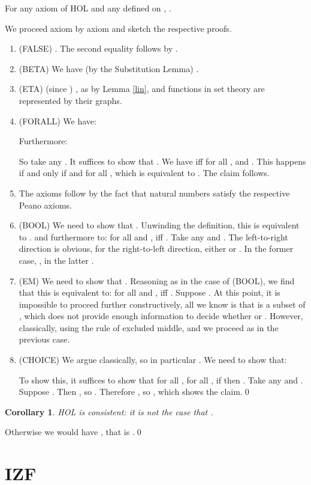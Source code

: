\documentclass{LMCS}
\newtheorem{corollary}[thm]{Corollary}
\begin{document}
\begin{thm}\label{soundness}
For any axiom  of HOL and any  defined on ,  .
\end{thm}
\proof
We proceed axiom by axiom and sketch the respective proofs.
\begin{enumerate}[]
\item (FALSE) . The second equality follows by . 
\item (BETA) 
We have  (by the Substitution Lemma) .
\item (ETA) 
 (since
) , as by Lemma \ref{lin},  and functions in
set theory are represented by their graphs.
\item (FORALL) We have:

Furthermore:

So take any . It suffices to show that .
We have  iff for all ,  and . This happens if and only if  and for all ,  which is equivalent to . The claim follows. 
\item The axioms  follow by the fact that natural numbers
satisfy the respective Peano axioms.
\item (BOOL) We need to show that . Unwinding the definition, this is equivalent to
. and furthermore to: for all  and ,  iff . Take any  and . The
left-to-right direction is obvious, for the right-to-left direction, either  or
. In the former case, , in the latter .
\item (EM) We need to show that . Reasoning as in the case of (BOOL), we find that this is
equivalent to: for all  and ,  iff . Suppose . At this point, it is
impossible to proceed further constructively, all we know is that  is a
subset of , which does not provide enough information to decide whether  or . However, classically, using the rule of excluded middle,  and we
proceed as in the previous case.
\item (CHOICE) 
We argue classically, so in particular . We need to show that:


To show this, it
suffices to show that for all , for all , if  then . Take any
 and . Suppose . Then , so .
Therefore , so 
, which shows the claim.\qed
\end{enumerate}

\begin{corollary}
HOL is consistent: it is not the case that .
\end{corollary}
\proof
Otherwise we would have , that is .\qed

\section{IZF}\label{izf}
\end{document}
